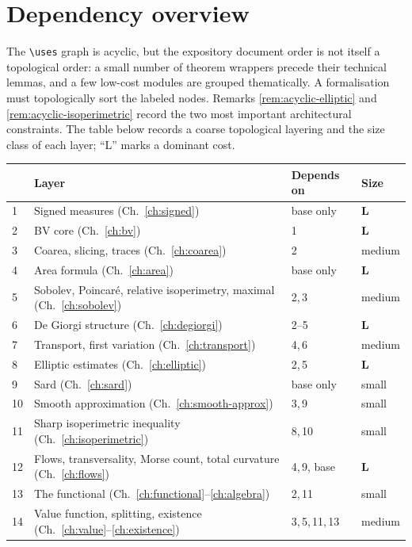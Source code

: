 \chapter{Dependency overview}\label{ch:dependencies}

The \verb|\uses| graph is acyclic, but the expository document order is not
itself a topological order: a small number of theorem wrappers precede their
technical lemmas, and a few low-cost modules are grouped thematically.  A
formalisation must topologically sort the labeled nodes.  Remarks
\ref{rem:acyclic-elliptic} and \ref{rem:acyclic-isoperimetric} record the two
most important architectural constraints.  The table below records a coarse
topological layering and the size class of each layer; ``L'' marks a dominant
cost.

\begin{longtable}{@{}p{}p{}p{}p{}@{}}
\toprule
& \textbf{Layer} & \textbf{Depends on} & \textbf{Size} \\
\midrule
\endhead
1 & Signed measures (Ch.~\ref{ch:signed}) & base only & \textbf{L} \\
2 & BV core (Ch.~\ref{ch:bv}) & 1 & \textbf{L} \\
3 & Coarea, slicing, traces (Ch.~\ref{ch:coarea}) & 2 & medium \\
4 & Area formula (Ch.~\ref{ch:area}) & base only & \textbf{L} \\
5 & Sobolev, Poincar\'e, relative isoperimetry, maximal (Ch.~\ref{ch:sobolev}) & 2,\,3 & medium \\
6 & De Giorgi structure (Ch.~\ref{ch:degiorgi}) & 2--5 & \textbf{L} \\
7 & Transport, first variation (Ch.~\ref{ch:transport}) & 4,\,6 & medium \\
8 & Elliptic estimates (Ch.~\ref{ch:elliptic}) & 2,\,5 & \textbf{L} \\
9 & Sard (Ch.~\ref{ch:sard}) & base only & small \\
10 & Smooth approximation (Ch.~\ref{ch:smooth-approx}) & 3,\,9 & small \\
11 & Sharp isoperimetric inequality (Ch.~\ref{ch:isoperimetric}) & 8,\,10 & small \\
12 & Flows, transversality, Morse count, total curvature (Ch.~\ref{ch:flows}) & 4,\,9, base & \textbf{L} \\
13 & The functional (Ch.~\ref{ch:functional}--\ref{ch:algebra}) & 2,\,11 & small \\
14 & Value function, splitting, existence (Ch.~\ref{ch:value}--\ref{ch:existence}) & 3,\,5,\,11,\,13 & medium \\

\end{longtable}
